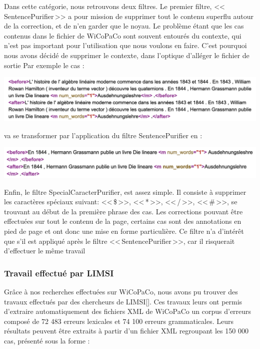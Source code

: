 \documentclass[11pt]{article}
\begin{document}
Dans cette cat\'{e}gorie, nous retrouvons deux filtres. Le premier filtre, <<\,SentencePurifier\,>> a pour mission de supprimer tout le contenu superflu autour de la correction, et de n'en garder que le noyau. Le probl\`{e}me \'{e}tant que les cas contenus dans le fichier de WiCoPaCo sont souvent entour\'{e}s du contexte, qui n'est pas important pour l'utilisation que nous voulons en faire. C'est pourquoi nous avons d\'{e}cid\'{e} de supprimer le contexte, dans l'optique d'all\'{e}ger le fichier de sortie
Par exemple le cas : 

\begin{center}
\includegraphics[width=14cm]{exemple14.png} %
\end{center}
va se transformer par l'application du filtre SentencePurifier en : 
\begin{center}
\includegraphics[width=14cm]{exemple15.png} %
\end{center}
Enfin, le filtre SpecialCaracterPurifier, est assez simple. Il consiste \`{a} supprimer les caract\`{e}res sp\'{e}ciaux suivant: <<\,\$\,>>, <<\,*\,>>, <<\,/\,>>, <<\,\#\,>>, se trouvant au d\'{e}but de la premi\`{e}re phrase des cas. Les corrections pouvant \^{e}tre effectu\'{e}es sur tout le contenu de la page, certains cas sont des annotations en pied de page et ont donc une mise en forme particuli\`{e}re.
Ce filtre n'a d'int\'{e}r\^{e}t que s'il est appliqu\'{e} apr\`{e}s le filtre <<\,SentencePurifier\,>>, car il risquerait d'effectuer le m\^{e}me travail


\subsubsection{Travail effectu\'{e} par LIMSI}

Gr\^{a}ce \`{a} nos recherches effectu\'{e}es sur WiCoPaCo, nous avons pu trouver des travaux effectu\'{e}s par des chercheurs de LIMSI[\cite[3]{3}]. Ces travaux \autocite[1]{https://wicopaco.limsi.fr/pub/taln10.pdf} leurs ont permis d'extraire automatiquement des fichiers XML de WiCoPaCo un corpus d'erreurs compos\'{e} de 72 483 erreurs lexicales et 74 100 erreurs grammaticales. Leurs r\'{e}sultats peuvent \^{e}tre extraits 
\`{a} partir d'un fichier XML regroupant les 150 000 cas, pr\'{e}sent\'{e} sous la forme :
\end{document}
